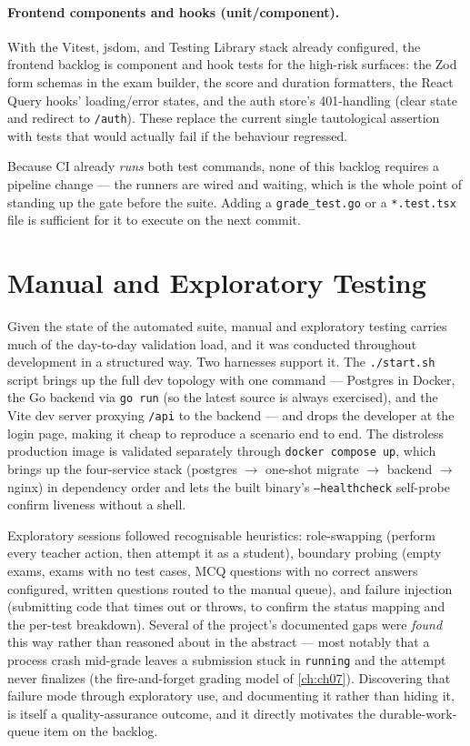 \paragraph{Frontend components and hooks (unit/component).} With the
Vitest, jsdom, and Testing Library stack already configured, the frontend
backlog is component and hook tests for the high-risk surfaces: the Zod
form schemas in the exam builder, the score and duration formatters, the
React Query hooks' loading/error states, and the auth store's 401-handling
(clear state and redirect to \texttt{/auth}). These replace the current
single tautological assertion with tests that would actually fail if the
behaviour regressed.

Because CI already \emph{runs} both test commands, none of this backlog
requires a pipeline change --- the runners are wired and waiting, which
is the whole point of standing up the gate before the suite. Adding a
\texttt{grade\_test.go} or a \texttt{*.test.tsx} file is sufficient for
it to execute on the next commit.

\section{Manual and Exploratory Testing}\label{sec:manual}

Given the state of the automated suite, manual and exploratory testing
carries much of the day-to-day validation load, and it was conducted
throughout development in a structured way. Two harnesses support it. The
\texttt{./start.sh} script brings up the full dev topology with one
command --- Postgres in Docker, the Go backend via \texttt{go run} (so
the latest source is always exercised), and the Vite dev server proxying
\texttt{/api} to the backend --- and drops the developer at the login
page, making it cheap to reproduce a scenario end to end. The distroless
production image is validated separately through
\texttt{docker compose up}, which brings up the four-service stack
(postgres $\rightarrow$ one-shot migrate $\rightarrow$ backend
$\rightarrow$ nginx) in dependency order and lets the built binary's
\texttt{--healthcheck} self-probe confirm liveness without a shell.

Exploratory sessions followed recognisable heuristics: role-swapping
(perform every teacher action, then attempt it as a student), boundary
probing (empty exams, exams with no test cases, MCQ questions with no
correct answers configured, written questions routed to the manual queue),
and failure injection (submitting code that times out or throws, to
confirm the status mapping and the per-test breakdown). Several of the
project's documented gaps were \emph{found} this way rather than
reasoned about in the abstract --- most notably that a process crash
mid-grade leaves a submission stuck in \texttt{running} and the attempt
never finalizes (the fire-and-forget grading model of \cref{ch:ch07}).
Discovering that failure mode through exploratory use,
and documenting it rather than hiding it, is itself a quality-assurance
outcome, and it directly motivates the durable-work-queue item on the
backlog.

